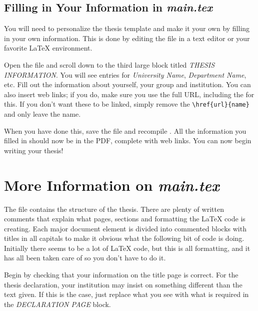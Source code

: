 \subsection{Filling in Your Information in \emph{main.tex}}\label{FillingFile}

You will need to personalize the thesis template and make it your own by filling in your own information. This is done by editing the  file in a text editor or your favorite LaTeX environment.

Open the file and scroll down to the third large block titled \emph{THESIS INFORMATION}. You will see entries for \emph{University Name}, \emph{Department Name}, etc. Fill out the information about yourself, your group and institution.%
You can also insert web links; if you do, make sure you use the full URL, including the  for this. If you don't want these to be linked, simply remove the \verb|\href{url}{name}| and only leave the name.

When you have done this, save the file and recompile . All the information you filled in should now be in the PDF, complete with web links. You can now begin writing your thesis!


\section{More Information on \emph{main.tex}}

The  file contains the structure of the thesis. There are plenty of written comments that explain what pages, sections and formatting the LaTeX code is creating. Each major document element is divided into commented blocks with titles in all capitals to make it obvious what the following bit of code is doing. Initially there seems to be a lot of LaTeX code, but this is all formatting, and it has all been taken care of so you don't have to do it.

Begin by checking that your information on the title page is correct. For the thesis declaration, your institution may insist on something different than the text given. If this is the case, just replace what you see with what is required in the \emph{DECLARATION PAGE} block.

